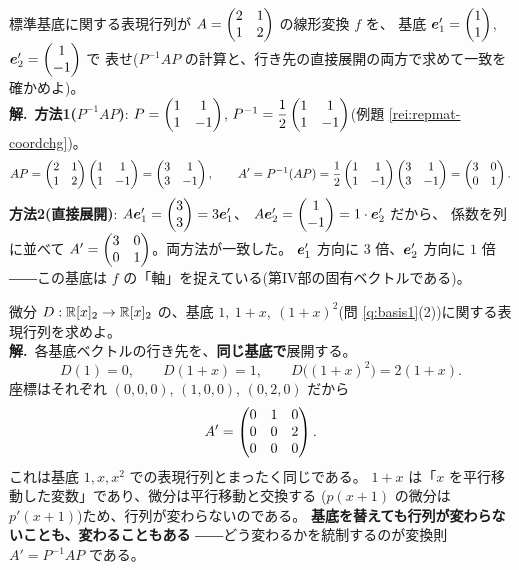 \begin{rei}[例題・標準(変換則の実演)]\label{rei:repmat-change-ex}
標準基底に関する表現行列が $A = \begin{pmatrix}2 & 1 \\ 1 & 2\end{pmatrix}$ の線形変換 $f$ を、
基底 $\bm{e}'_1 = \begin{pmatrix}1 \\ 1\end{pmatrix}$, $\bm{e}'_2 = \begin{pmatrix}1 \\ -1\end{pmatrix}$ で
表せ($P^{-1}AP$ の計算と、行き先の直接展開の両方で求めて一致を確かめよ)。\\
\textbf{解.}\ \textbf{方法1($P^{-1}AP$)}:
$P = \begin{pmatrix}1 & 1 \\ 1 & -1\end{pmatrix}$,
$P^{-1} = \dfrac{1}{2}\begin{pmatrix}1 & 1 \\ 1 & -1\end{pmatrix}$(例題 \ref{rei:repmat-coordchg})。
\[
AP = \begin{pmatrix}2 & 1 \\ 1 & 2\end{pmatrix}\begin{pmatrix}1 & 1 \\ 1 & -1\end{pmatrix} = \begin{pmatrix}3 & 1 \\ 3 & -1\end{pmatrix},
\qquad
A' = P^{-1}(AP) = \frac{1}{2}\begin{pmatrix}1 & 1 \\ 1 & -1\end{pmatrix}\begin{pmatrix}3 & 1 \\ 3 & -1\end{pmatrix}
= \begin{pmatrix}3 & 0 \\ 0 & 1\end{pmatrix}.
\]
\textbf{方法2(直接展開)}:
$A\bm{e}'_1 = \begin{pmatrix}3 \\ 3\end{pmatrix} = 3\bm{e}'_1$、
$A\bm{e}'_2 = \begin{pmatrix}1 \\ -1\end{pmatrix} = 1 \cdot \bm{e}'_2$ だから、
係数を列に並べて $A' = \begin{pmatrix}3 & 0 \\ 0 & 1\end{pmatrix}$。両方法が一致した。
$\bm{e}'_1$ 方向に $3$ 倍、$\bm{e}'_2$ 方向に $1$ 倍
――この基底は $f$ の「軸」を捉えている(第IV部の固有ベクトルである)。
\end{rei}

\begin{rei}[例題・標準(多項式空間での基底取り替え)]\label{rei:repmat-poly}
微分 $D : \mathbb{R}[x]_2 \to \mathbb{R}[x]_2$ の、基底
$1,\ 1 + x,\ (1 + x)^2$(問 \ref{q:basis1}(2))に関する表現行列を求めよ。\\
\textbf{解.}\ 各基底ベクトルの行き先を、\textbf{同じ基底で}展開する。
\[
D(1) = 0, \qquad
D(1 + x) = 1, \qquad
D\bigl((1 + x)^2\bigr) = 2(1 + x).
\]
座標はそれぞれ $(0,0,0)$, $(1,0,0)$, $(0,2,0)$ だから
\[
A' = \begin{pmatrix}0 & 1 & 0 \\ 0 & 0 & 2 \\ 0 & 0 & 0\end{pmatrix}.
\]
これは基底 $1, x, x^2$ での表現行列とまったく同じである。
$1 + x$ は「$x$ を平行移動した変数」であり、微分は平行移動と交換する
($p(x + 1)$ の微分は $p'(x + 1)$)ため、行列が変わらないのである。
\textbf{基底を替えても行列が変わらないことも、変わることもある}
――どう変わるかを統制するのが変換則 $A' = P^{-1}AP$ である。
\end{rei}

